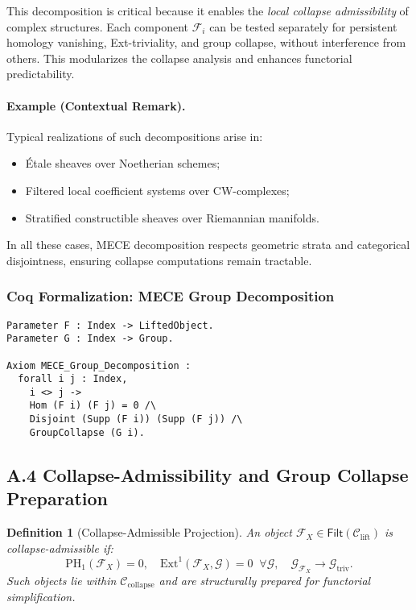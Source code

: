 \documentclass[11pt]{article}
\newtheorem{definition}[theorem]{Definition}
\begin{document}
This decomposition is critical because it enables the \emph{local collapse admissibility} of complex structures. Each component \( \mathcal{F}_i \) can be tested separately for persistent homology vanishing, Ext-triviality, and group collapse, without interference from others. This modularizes the collapse analysis and enhances functorial predictability.

\paragraph{Example (Contextual Remark).}
Typical realizations of such decompositions arise in:
\begin{itemize}
  \item Étale sheaves over Noetherian schemes;
  \item Filtered local coefficient systems over CW-complexes;
  \item Stratified constructible sheaves over Riemannian manifolds.
\end{itemize}
In all these cases, MECE decomposition respects geometric strata and categorical disjointness, ensuring collapse computations remain tractable.

\subsubsection*{Coq Formalization: MECE Group Decomposition}
\begin{lstlisting}[language=Coq, caption=Group-Compatible MECE Decomposition]
Parameter F : Index -> LiftedObject.
Parameter G : Index -> Group.

Axiom MECE_Group_Decomposition :
  forall i j : Index,
    i <> j ->
    Hom (F i) (F j) = 0 /\
    Disjoint (Supp (F i)) (Supp (F j)) /\
    GroupCollapse (G i).
\end{lstlisting}


\subsection*{A.4 Collapse-Admissibility and Group Collapse Preparation}

\begin{definition}[Collapse-Admissible Projection]
An object \( \mathcal{F}_X \in \mathsf{Filt}(\mathcal{C}_{\mathrm{lift}}) \) is \emph{collapse-admissible} if:
\[
\mathrm{PH}_1(\mathcal{F}_X) = 0, \quad \mathrm{Ext}^1(\mathcal{F}_X, \mathcal{G}) = 0 \;\; \forall \mathcal{G}, \quad \mathcal{G}_{\mathcal{F}_X} \longrightarrow \mathcal{G}_{\mathrm{triv}}.
\]
Such objects lie within \( \mathcal{C}_{\mathrm{collapse}} \) and are structurally prepared for functorial simplification.
\end{definition}
\end{document}
